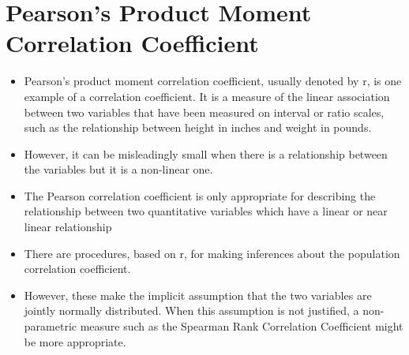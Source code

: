\documentclass[]{report}
\begin{document}
\section{Pearson's Product Moment Correlation Coefficient}
\begin{itemize}
\item Pearson's product moment correlation coefficient, usually denoted by r, is one example of a correlation coefficient. It is a measure of the linear association between two variables that have been measured on interval or ratio scales, such as the relationship between height in inches and weight in pounds. 
\item 
However, it can be misleadingly small when there is a relationship between the variables but it is a non-linear one.
\item The Pearson correlation coefficient is only appropriate for
	describing the relationship between two quantitative variables
	which have a linear or near linear relationship

\item
There are procedures, based on r, for making inferences about the population correlation coefficient. 
\item However, these make the implicit assumption that the two variables are jointly normally distributed. 
When this assumption is not justified, a non-parametric measure such as the Spearman Rank Correlation Coefficient might be more appropriate.
\end{itemize}
\end{document}
